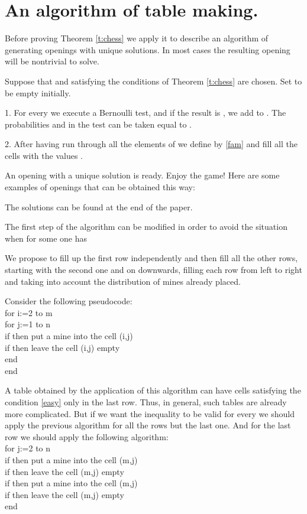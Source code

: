 \documentclass[english,12pt]{article}
\theoremstyle{remark}
\theoremstyle{definition}
\theoremstyle{definition}
\begin{document}
\section{An algorithm of table making.}


Before proving Theorem \ref{t:chess} we apply it to describe an algorithm of generating openings
with unique solutions. In most cases the resulting opening will be nontrivial to solve.

Suppose that  and  satisfying the conditions  of Theorem \ref{t:chess} are chosen. Set  to
be empty initially.

1. For every  we execute a Bernoulli test,
and if the result is , we add  to . The probabilities
 and  in the test can be taken equal to .

2. After having run through all the elements of  we define  by \eqref{fam}
and fill all the cells  with the values .

An opening with a unique solution is ready. Enjoy the game! Here are some examples of openings that
can be obtained this way:

 The solutions can be found at the
end of the paper.

The first step of the algorithm can be modified in order to avoid the situation when for some  one has

We propose to fill up the first row independently and then fill all the other rows, starting with
the second one and on downwards, filling each row from left to right and taking into account the
distribution of mines already placed.

Consider the following pseudocode:
\\ for i:=2 to m
\\ for j:=1 to n
\\ if  then put a mine into the cell (i,j)
\\ if  then leave the cell (i,j) empty
\\ end
\\ end

A table obtained by the application of this algorithm can have cells satisfying the condition
\eqref{easy} only in the last row. Thus, in general, such tables are already more complicated. But
if we want the inequality  to be valid for every  we
should apply the previous algorithm for all the rows but the last one. And for the last row we
should apply the following algorithm:
\\ for j:=2 to n
\\   \quad if  then put a mine into the cell (m,j)
\\   \quad if  then leave the cell (m,j) empty
\\  \quad if  then put a mine into the cell (m,j)
\\  \quad if  then leave the cell (m,j) empty
\\ end
\end{document}
